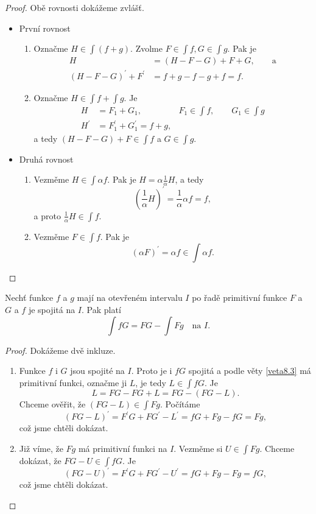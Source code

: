 \begin{proof}Obě rovnosti dokážeme zvlášť.
\begin{itemize}
	\item První rovnost
	\begin{enumerate}
		\item[$\subseteq$] Označme $H\in \int(f+g)$. Zvolme $F \in \int f, G\in \int g$. Pak je
		\begin{align*}
		H &= (H-F-G)+F+G, \qquad \text{a}\\
		(H-F-G)^\prime + F^\prime &= f+g-f-g+f = f.
		\end{align*}
		\item[$\supseteq$] Označme $H\in \int f + \int g$. Je
		\begin{align*}
		H &= F_1+G_1, & F_1 \in \int f, \qquad G_1\in \int g\\
		H^\prime &= F^\prime _1+ G_1^\prime = f+g,
		\end{align*}
		a tedy $(H-F-G) +F \in \int f$ a $G\in \int g$.
	\end{enumerate}
	\item Druhá rovnost
	\begin{enumerate}
		\item[$\subseteq$] Vezměme $H\in \int \alpha f$. Pak je $H=\alpha \frac{1}{\alpha}H$, a tedy
		$$
  \left( \frac{1}{\alpha}H \right )^\prime = \frac{1}{\alpha}\alpha f = f,
		$$
		a proto $\frac{1}{\alpha}H \in \int f$.
		\item[$\supseteq$] Vezměme $F \in \int f$. Pak je
		$$
		    (\alpha F)^\prime = \alpha f \in \int \alpha f.
		$$
		\qedhere
	\end{enumerate}
\end{itemize}
\end{proof}

\begin{veta}\label{veta8.4}
Nechť funkce $f$ a $g$ mají na otevřeném intervalu $I$ po řadě primitivní funkce $F$ a $G$ a $f$ je spojitá na $I$. Pak platí
\[
\int fG = FG - \int Fg \quad \text{na } I.
\]
\end{veta}

\begin{proof}
	Dokážeme dvě inkluze.
	\begin{enumerate}
		\item[$\subseteq$] Funkce $f$ i $G$ jsou spojité na $I$. Proto je i $fG$ spojitá
		a podle věty \ref{veta8.3} má primitivní funkci, označme ji $L$, je tedy $L\in \int fG$.
		Je
		$$
		    L = FG-FG+L = FG- ( FG-L).
		$$
		Chceme ověřit, že $(FG-L) \in \int Fg$. Počítáme
		$$
		    (FG-L)^\prime = F^\prime G + FG^\prime - L^\prime = fG+Fg - fG = Fg,
		$$
		což jsme chtěli dokázat.
		\item[$\supseteq$] Již víme, že $Fg$ má primitivní funkci na $I$.  Vezměme si $U\in \int Fg$.
		Chceme dokázat, že
		$
		    FG-U \in \int fG
		$.
		Je
		$$
		    (FG-U)^\prime = F^\prime G + FG^\prime - U^\prime = fG+Fg-Fg=fG,
		$$
		což jsme chtěli dokázat. \qedhere
	\end{enumerate}
\end{proof}

